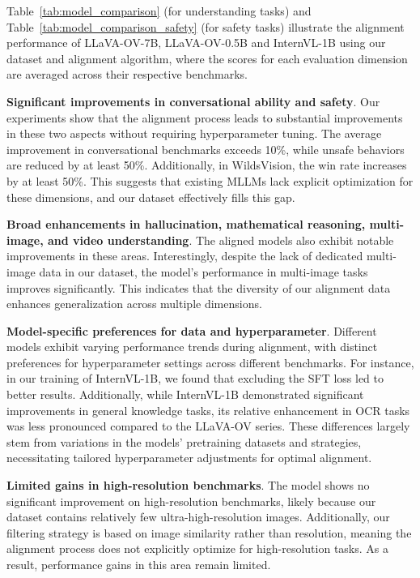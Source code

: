 Table~\ref{tab:model_comparison} (for understanding tasks) and Table~\ref{tab:model_comparison_safety} (for safety tasks) illustrate the alignment performance of LLaVA-OV-7B, LLaVA-OV-0.5B and InternVL-1B using our dataset and alignment algorithm, where the scores for each evaluation dimension are averaged across their respective benchmarks.

\textbf{Significant improvements in conversational ability and safety}. Our experiments show that the alignment process leads to substantial improvements in these two aspects without requiring hyperparameter tuning. The average improvement in conversational benchmarks exceeds 10\%, while unsafe behaviors are reduced by at least 50\%. Additionally, in WildsVision, the win rate increases by at least 50\%. This suggests that existing MLLMs lack explicit optimization for these dimensions, and our dataset effectively fills this gap.

\textbf{Broad enhancements in hallucination, mathematical reasoning, multi-image, and video understanding}. The aligned models also exhibit notable improvements in these areas. Interestingly, despite the lack of dedicated multi-image data in our dataset, the model's performance in multi-image tasks improves significantly. This indicates that the diversity of our alignment data enhances generalization across multiple dimensions.

\textbf{Model-specific preferences for data and hyperparameter}. Different models exhibit varying performance trends during alignment, with distinct preferences for hyperparameter settings across different benchmarks. For instance, in our training of InternVL-1B, we found that excluding the SFT loss led to better results. Additionally, while InternVL-1B demonstrated significant improvements in general knowledge tasks, its relative enhancement in OCR tasks was less pronounced compared to the LLaVA-OV series. These differences largely stem from variations in the models' pretraining datasets and strategies, necessitating tailored hyperparameter adjustments for optimal alignment.

\textbf{Limited gains in high-resolution benchmarks}. The model shows no significant improvement on high-resolution benchmarks, likely because our dataset contains relatively few ultra-high-resolution images. Additionally, our filtering strategy is based on image similarity rather than resolution, meaning the alignment process does not explicitly optimize for high-resolution tasks. As a result, performance gains in this area remain limited.



